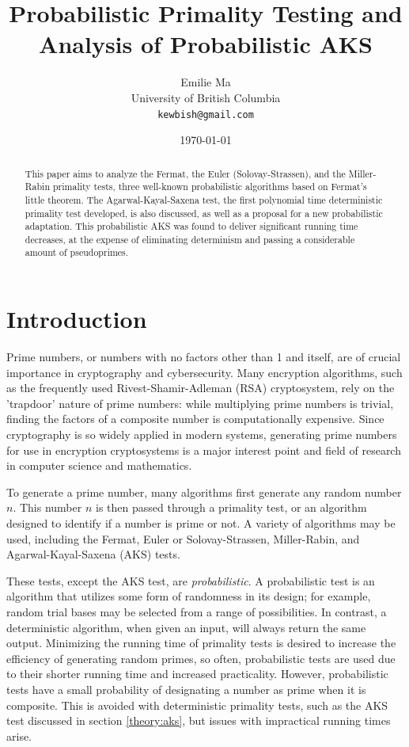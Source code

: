 \documentclass{article}
\title[Primality Testing]{Probabilistic Primality Testing and Analysis of Probabilistic AKS}
\author[Emilie Ma]{%
Emilie Ma\\%
University of British Columbia\\%
\texttt{kewbish@gmail.com}%
}
\date{\today}
\begin{document}
\maketitle
\newpage
\begin{abstract}
This paper aims to analyze the Fermat, the Euler (Solovay-Strassen), and the Miller-Rabin primality tests, three well-known probabilistic algorithms based on Fermat's little theorem. The Agarwal-Kayal-Saxena test, the first polynomial time deterministic primality test developed, is also discussed, as well as a proposal for a new probabilistic adaptation. This probabilistic AKS was found to deliver significant running time decreases, at the expense of eliminating determinism and passing a considerable amount of pseudoprimes.
\end{abstract}

\section{Introduction}
Prime numbers, or numbers with no factors other than 1 and itself, are of crucial importance in cryptography and cybersecurity. Many encryption algorithms, such as the frequently used Rivest-Shamir-Adleman (RSA) cryptosystem, rely on the 'trapdoor' nature of prime numbers: while multiplying prime numbers is trivial, finding the factors of a composite number is computationally expensive. Since cryptography is so widely applied in modern systems, generating prime numbers for use in encryption cryptosystems is a major interest point and field of research in computer science and mathematics.

To generate a prime number, many algorithms first generate any random number $n$. This number $n$ is then passed through a primality test, or an algorithm designed to identify if a number is prime or not. A variety of algorithms may be used, including the Fermat, Euler or Solovay-Strassen, Miller-Rabin, and Agarwal-Kayal-Saxena (AKS) tests.

These tests, except the AKS test, are \emph{probabilistic}. A probabilistic test is an algorithm that utilizes some form of randomness in its design; for example, random trial bases may be selected from a range of possibilities. In contrast, a deterministic algorithm, when given an input, will always return the same output. Minimizing the running time of primality tests is desired to increase the efficiency of generating random primes, so often, probabilistic tests are used due to their shorter running time and increased practicality. However, probabilistic tests have a small probability of designating a number as prime when it is composite. This is avoided with deterministic primality tests, such as the AKS test discussed in section \ref{theory:aks}, but issues with impractical running times arise.
\end{document}
